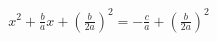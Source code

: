 \documentclass[preview]{standalone}
\begin{document}
\begin{align*}
x^2 + \frac{b}{a}x + (\frac{b}{2a})^2 = -\frac{c}{a} + (\frac{b}{2a})^2
\end{align*}
\end{document}
